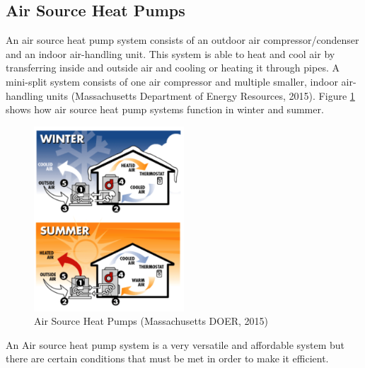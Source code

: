     \subsection{Air Source Heat Pumps}
    \par An air source heat pump system consists of an outdoor air compressor/condenser and an indoor air-handling unit. This system is able to heat and cool air by transferring inside and outside air and cooling or heating it through pipes. A mini-split system consists of one air compressor and multiple smaller, indoor air-handling units (Massachusetts Department of Energy Resources, 2015). Figure \ref{fig:ashp} shows how air source heat pump systems function in winter and summer.
    \begin{figure}[h]
      \centering
        \includegraphics[width=0.5\textwidth]{images/06-AirSourceHeatPump}
      \caption{Air Source Heat Pumps (Massachusetts DOER, 2015)}
      \label{fig:ashp}
    \end{figure}
    \par An Air source heat pump system is a very versatile and affordable system but there are certain conditions that must be met in order to make it efficient.
    
